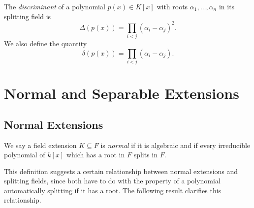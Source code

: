\documentclass[12pt,oneside]{book}
\begin{document}
\begin{definition}[Discriminant]
	The \emph{discriminant} of a polynomial \( p(x) \in K[x] \) with roots \( \alpha_1,
	\dots,\alpha_n \) in its splitting field is
	\begin{equation*}
		\Delta(p(x)) = \prod_{i < j}(\alpha_i - \alpha_j)^2.
	\end{equation*}
	We also define the quantity
	\begin{equation*}
		\delta(p(x)) = \prod_{i < j}(\alpha_i - \alpha_j).
	\end{equation*}
\end{definition}

\chapter{Normal and Separable Extensions}
\section{Normal Extensions}
\begin{definition}
	We say a field extension \( K \subseteq F \) is \emph{normal} if it is algebraic and if every
	irreducible polynomial of \( k[x] \) which has a root in \( F \) splits in \( F \).
\end{definition}
This definition suggests a certain relationship between normal extensions and splitting
fields, since both have to do with the property of a polynomial automatically splitting if
it has a root. The following result clarifies this relationship.
\end{document}
